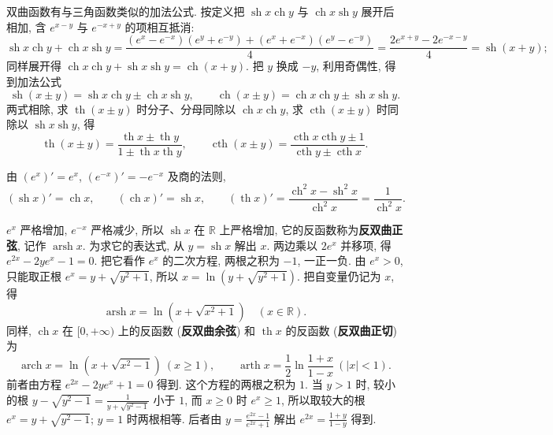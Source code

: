 \documentclass[UTF8,openany]{ctexbook}
\theoremstyle{chinesetextbook}
\begin{document}
双曲函数有与三角函数类似的加法公式. 按定义把 $\operatorname{sh}x\operatorname{ch}y$ 与 $\operatorname{ch}x\operatorname{sh}y$ 展开后相加, 含 $e^{x-y}$ 与 $e^{-x+y}$ 的项相互抵消:
\[
\operatorname{sh}x\operatorname{ch}y+\operatorname{ch}x\operatorname{sh}y=\frac{(e^x-e^{-x})(e^y+e^{-y})+(e^x+e^{-x})(e^y-e^{-y})}4=\frac{2e^{x+y}-2e^{-x-y}}4=\operatorname{sh}(x+y);
\]
同样展开得 $\operatorname{ch}x\operatorname{ch}y+\operatorname{sh}x\operatorname{sh}y=\operatorname{ch}(x+y)$. 把 $y$ 换成 $-y$, 利用奇偶性, 得到加法公式
\[
\operatorname{sh}(x\pm y)=\operatorname{sh}x\operatorname{ch}y\pm\operatorname{ch}x\operatorname{sh}y,\qquad\operatorname{ch}(x\pm y)=\operatorname{ch}x\operatorname{ch}y\pm\operatorname{sh}x\operatorname{sh}y.
\]
两式相除, 求 $\operatorname{th}(x\pm y)$ 时分子、分母同除以 $\operatorname{ch}x\operatorname{ch}y$, 求 $\operatorname{cth}(x\pm y)$ 时同除以 $\operatorname{sh}x\operatorname{sh}y$, 得
\[
\operatorname{th}(x\pm y)=\frac{\operatorname{th}x\pm\operatorname{th}y}{1\pm\operatorname{th}x\operatorname{th}y},\qquad\operatorname{cth}(x\pm y)=\frac{\operatorname{cth}x\operatorname{cth}y\pm1}{\operatorname{cth}y\pm\operatorname{cth}x}.
\]

由 $(e^x)'=e^x$, $(e^{-x})'=-e^{-x}$ 及商的法则,
\[
(\operatorname{sh}x)'=\operatorname{ch}x,\qquad(\operatorname{ch}x)'=\operatorname{sh}x,\qquad(\operatorname{th}x)'=\frac{\operatorname{ch}^2x-\operatorname{sh}^2x}{\operatorname{ch}^2x}=\frac1{\operatorname{ch}^2x}.
\]

$e^x$ 严格增加, $e^{-x}$ 严格减少, 所以 $\operatorname{sh}x$ 在 $\mathbb R$ 上严格增加, 它的反函数称为\textbf{反双曲正弦}, 记作 $\operatorname{arsh}x$. 为求它的表达式, 从 $y=\operatorname{sh}x$ 解出 $x$. 两边乘以 $2e^x$ 并移项, 得 $e^{2x}-2ye^x-1=0$. 把它看作 $e^x$ 的二次方程, 两根之积为 $-1$, 一正一负. 由 $e^x>0$, 只能取正根 $e^x=y+\sqrt{y^2+1}$, 所以 $x=\ln\left(y+\sqrt{y^2+1}\right)$. 把自变量仍记为 $x$, 得
\[
\operatorname{arsh}x=\ln\left(x+\sqrt{x^2+1}\right)\quad(x\in\mathbb R).
\]
同样, $\operatorname{ch}x$ 在 $[0,+\infty)$ 上的反函数 (\textbf{反双曲余弦}) 和 $\operatorname{th}x$ 的反函数 (\textbf{反双曲正切}) 为
\[
\operatorname{arch}x=\ln\left(x+\sqrt{x^2-1}\right)\ (x\ge1),\qquad\operatorname{arth}x=\frac12\ln\frac{1+x}{1-x}\ (|x|<1).
\]
前者由方程 $e^{2x}-2ye^x+1=0$ 得到. 这个方程的两根之积为 $1$. 当 $y>1$ 时, 较小的根 $\displaystyle y-\sqrt{y^2-1}=\frac1{y+\sqrt{y^2-1}}$ 小于 $1$, 而 $x\ge0$ 时 $e^x\ge1$, 所以取较大的根 $e^x=y+\sqrt{y^2-1}$; $y=1$ 时两根相等. 后者由 $\displaystyle y=\frac{e^{2x}-1}{e^{2x}+1}$ 解出 $\displaystyle e^{2x}=\frac{1+y}{1-y}$ 得到.
\end{document}
